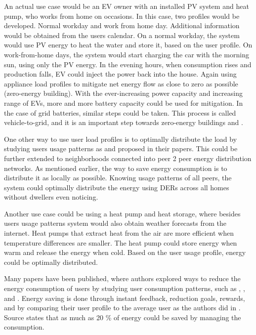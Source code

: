 An actual use case would be an EV owner with an installed PV system and heat pump, who works from home on occasions.
In this case, two profiles would be developed. Normal workday and work from home day.
Additional information would be obtained from the users calendar. 
On a normal workday, the system would use PV energy to heat the water and store it, based on the user profile.
On work-from-home days, the system would start charging the car with the morning sun, using only the PV energy. 
In the evening hours, when consumption rises and production falls, EV could inject the power back into the house. 
Again using appliance load profiles to mitigate net energy flow as close to zero as possible (zero-energy building).
With the ever-increasing power capacity and increasing range of EVs, more and more battery capacity could be used for mitigation. 
In the case of grid batteries, similar steps could be taken.
This process is called vehicle-to-grid, and it is an important step towards zero-energy buildings \cite{EV2018} and \cite{EV2020}.

One other way to use user load profiles is to optimally distribute the load by studying users usage patterns as \cite{Chuan2014} and \cite{shift2015} proposed in their papers. 
This could be further extended to neighborhoods connected into peer 2 peer energy distribution networks.
As mentioned earlier, the way to save energy consumption is to distribute it as locally as possible. 
Knowing usage patterns of all peers, the system could optimally distribute the energy using DERs across all homes without dwellers even noticing.

Another use case could be using a heat pump and heat storage,
where besides users usage patterns system would also obtain weather forecasts from the internet.
Heat pumps that extract heat from the air are more efficient when temperature differences are smaller. 
The heat pump could store energy when warm and release the energy when cold.
Based on the user usage profile, energy could be optimally distributed.

Many papers have been published, where authors explored ways to reduce the energy consumption of users by studying user consumption patterns,
such as \cite{energy_saving3}, \cite{energy_saving1}, \cite{energy_saving4} and \cite{energy_saving3}.
Energy saving is done through instant feedback, reduction goals, rewards, and by comparing their user profile to the average user as the authors did in \cite{Csoknyai2019}.
Source \cite{eu2006} states that as much as 20 \% of energy could be saved by managing the consumption.

